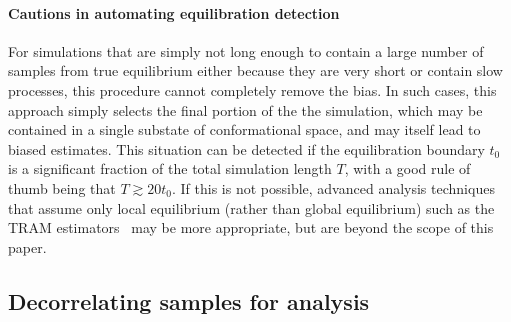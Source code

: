 \documentclass[9pt,bestpractices]{livecoms}
\begin{document}
\paragraph{Cautions in automating equilibration detection}
For simulations that are simply not long enough to contain a large number of samples from true equilibrium either because they are very short or contain slow processes, this procedure cannot completely remove the bias.
In such cases, this approach simply selects the final portion of the the simulation, which may be contained in a single substate of conformational space, and may itself lead to biased estimates. 
This situation can be detected if the equilibration boundary $t_0$ is a significant fraction of the total simulation length $T$, with a good rule of thumb being that $T \gtrsim 20 t_0$.
If this is not possible, advanced analysis techniques that assume only local equilibrium (rather than global equilibrium) such as the TRAM estimators~\cite{mey2014xtram,wu2016multiensemble,nuske2017markov} may be more appropriate, but are beyond the scope of this paper. 
%
\subsection{Decorrelating samples for analysis}
\label{sec:decorrelating-samples}
\end{document}
